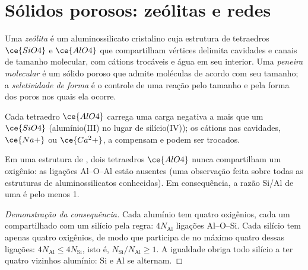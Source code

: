 \section{Sólidos porosos: zeólitas e redes}

\begin{definition}[Zeólitas]\label{def:b3:inorganic-materials:zeolite}
Uma \emph{zeólita} é um aluminossilicato cristalino cuja
estrutura de tetraedros $\ce{SiO4}$ e $\ce{AlO4}$ que compartilham vértices delimita cavidades e
canais de tamanho molecular, com cátions trocáveis e água em seu interior. Uma
\emph{peneira molecular} é um sólido poroso que admite
moléculas de acordo com seu tamanho; a \emph{seletividade de forma}
é o controle de uma reação pelo tamanho e pela forma dos poros nos
quais ela ocorre.
\end{definition}

Cada tetraedro $\ce{AlO4}$ carrega uma carga negativa a mais que um $\ce{SiO4}$
(alumínio(III) no lugar de silício(IV)); os cátions nas cavidades, $\ce{Na+}$ ou $\ce{Ca^2+}$,
a compensam e podem ser trocados.

\begin{proposition}\label{prop:b3:inorganic-materials:lowenstein}
Em uma estrutura de , dois tetraedros $\ce{AlO4}$ nunca compartilham um oxigênio: as ligações Al--O--Al
estão ausentes (uma observação feita sobre todas as estruturas de aluminossilicatos conhecidas). Em
consequência, a razão Si/Al de uma  é pelo menos 1.
\end{proposition}

\begin{proof}[Demonstração da consequência]
Cada alumínio tem quatro oxigênios, cada um compartilhado com um silício pela regra:
$4N_{\mathrm{Al}}$ ligações Al--O--Si. Cada silício tem apenas quatro oxigênios, de modo que participa de
no máximo quatro dessas ligações: $4N_{\mathrm{Al}} \le 4N_{\mathrm{Si}}$, isto é, $N_{\mathrm{Si}}/N_{\mathrm{Al}} \ge 1$. A igualdade obriga todo
silício a ter quatro vizinhos alumínio: Si e Al se alternam.
\end{proof}

